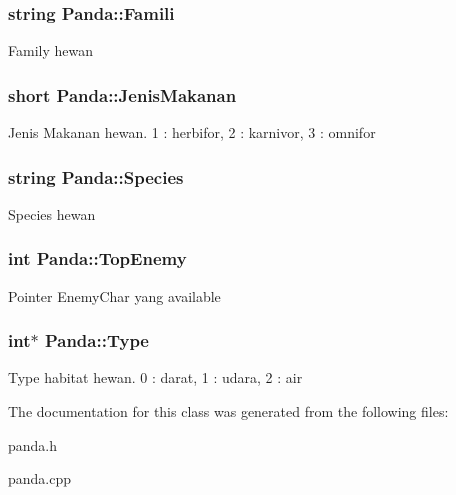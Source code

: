 \subsubsection[{\texorpdfstring{Famili}{Famili}}]{\setlength{\rightskip}{0pt plus 5cm}string Panda\+::\+Famili\hspace{0.3cm}{\ttfamily [protected]}}\hypertarget{class_panda_a98d20475a2aab4f0e51ad2736fbd525b}{}\label{class_panda_a98d20475a2aab4f0e51ad2736fbd525b}
Family hewan 
\subsubsection[{\texorpdfstring{Jenis\+Makanan}{JenisMakanan}}]{\setlength{\rightskip}{0pt plus 5cm}short Panda\+::\+Jenis\+Makanan\hspace{0.3cm}{\ttfamily [protected]}}\hypertarget{class_panda_a412fe34df61ad271848e885f1a637fe6}{}\label{class_panda_a412fe34df61ad271848e885f1a637fe6}
Jenis Makanan hewan. 1 \+: herbifor, 2 \+: karnivor, 3 \+: omnifor 
\subsubsection[{\texorpdfstring{Species}{Species}}]{\setlength{\rightskip}{0pt plus 5cm}string Panda\+::\+Species\hspace{0.3cm}{\ttfamily [protected]}}\hypertarget{class_panda_aed57d8b793f087f69487376bdcc7ced1}{}\label{class_panda_aed57d8b793f087f69487376bdcc7ced1}
Species hewan 
\subsubsection[{\texorpdfstring{Top\+Enemy}{TopEnemy}}]{\setlength{\rightskip}{0pt plus 5cm}int Panda\+::\+Top\+Enemy\hspace{0.3cm}{\ttfamily [protected]}}\hypertarget{class_panda_a77ac6578cbc8cfce5aafe47e04d4eb24}{}\label{class_panda_a77ac6578cbc8cfce5aafe47e04d4eb24}
Pointer Enemy\+Char yang available 
\subsubsection[{\texorpdfstring{Type}{Type}}]{\setlength{\rightskip}{0pt plus 5cm}int$\ast$ Panda\+::\+Type\hspace{0.3cm}{\ttfamily [protected]}}\hypertarget{class_panda_a63ee42a5ac524c0c97efbcf0f252b680}{}\label{class_panda_a63ee42a5ac524c0c97efbcf0f252b680}
Type habitat hewan. 0 \+: darat, 1 \+: udara, 2 \+: air 

The documentation for this class was generated from the following files\+:\begin{DoxyCompactItemize}
\item 
panda.\+h\item 
panda.\+cpp\end{DoxyCompactItemize}
